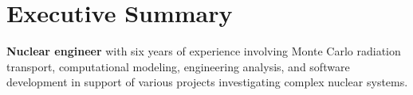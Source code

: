 
\section{Executive Summary}

\begin{justify}
\textbf{Nuclear engineer} with six years of experience involving Monte Carlo
radiation transport, computational
modeling, engineering analysis, and software development in support of various
projects investigating complex nuclear systems.
\end{justify}


